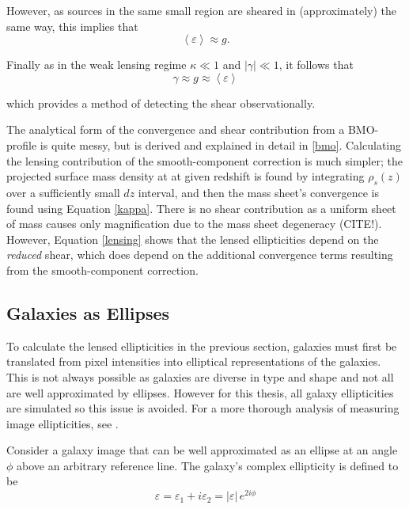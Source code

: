 \documentclass[%
 reprint,
 amsmath,amssymb,
 aps,nofootinbib
]{revtex4-1}
\begin{document}
\noindent However, as sources in the same small region are sheared in (approximately) the same way, this implies that
\begin{equation}
\left<\varepsilon\right>\approx g.
\end{equation}

 \noindent Finally as in the weak lensing regime ${\kappa\ll1}$ and ${|\gamma|\ll1}$, it follows that
 \begin{equation}
 \gamma\approx g\approx\left<\varepsilon\right>
 \end{equation}

 \noindent which provides a method of detecting the shear observationally.

 The analytical form of the convergence and shear contribution from a BMO-profile is quite messy, but is derived and explained in detail in \ref{bmo}. Calculating the lensing contribution of the smooth-component correction is much simpler; the projected surface mass density at at given redshift is found by integrating $\rho_s(z)$ over a sufficiently small $dz$ interval, and then the mass sheet's convergence is found using Equation \eqref{kappa}. There is no shear contribution as a uniform sheet of mass causes only magnification due to the mass sheet degeneracy (CITE!). However, Equation \eqref{lensing} shows that the lensed ellipticities depend on the \textit{reduced} shear, which does depend on the additional convergence terms resulting from the smooth-component correction.

\subsection{Galaxies as Ellipses} \label{galaxies_as_ellipses}

To calculate the lensed ellipticities in the previous section, galaxies must first be translated from pixel intensities into elliptical representations of the galaxies. This is not always possible as galaxies are diverse in type and shape and not all are well approximated by ellipses. However for this thesis, all galaxy ellipticities are simulated so this issue is avoided. For a more thorough analysis of measuring image ellipticities, see \cite{schneider}.

Consider a galaxy image that can be well approximated as an ellipse at an angle $\phi$ above an arbitrary reference line. The galaxy's complex ellipticity is defined to be
\begin{equation}\label{complex_ellipticity}
\varepsilon=\varepsilon_1+i\varepsilon_2=|\varepsilon|\,e^{2i\phi}
\end{equation}
\end{document}
